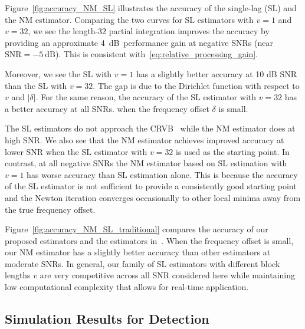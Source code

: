 Figure~\ref{fig:accuracy_NM_SL} illustrates the accuracy of the single-lag (SL) and the NM estimator.
Comparing the two curves for SL estimators with $v{=}1$ and $v=32$, 
we see the length-$32$ partial integration
improves the accuracy by providing an approximate
\SI{4}{\dB}~performance gain at negative SNRs
(near $\text{SNR}=\SI{-5}{\dB}$). This is consistent
with~\eqref{eq:relative_processing_gain}.

Moreover, we see the SL with $v=1$ has a slightly better accuracy 
at 10 dB SNR than the SL with $v=32$. The gap is due to the Dirichlet function with
respect to $v$ and $|\delta|$.
For the same reason, the accuracy of the SL estimator with $v=32$ has a better accuracy at all SNRs.
when the frequency offset $\delta$ is small.

The SL estimators do not approach the CRVB~\cite{Gini_98} while the NM
estimator does at high SNR. 
We also see that the NM estimator achieves improved accuracy at lower SNR
when the SL estimator with $v=32$ is used as the starting point. 
In contrast, at all negative SNRs the NM estimator based on SL estimation with $v=1$ has
worse accuracy than SL estimation alone.
This is because the accuracy of the SL estimator is not sufficient to
provide a consistently good starting point and the Newton iteration converges occasionally to 
other local minima away from the true frequency offset.

Figure~\ref{fig:accuracy_NM_SL_traditional} compares the accuracy of our proposed estimators
and the estimators in~\cite{kay_89,Fitz_94,Luise_Reggiannini_95}.
When the 
frequency offset is small, our NM estimator has a slightly better accuracy than other estimators at moderate SNRs.
In general, our family of  SL estimators with different block lengths $v$
are very competitive across all SNR considered here while maintaining
low computational complexity that allows for real-time application.

\subsection{Simulation Results for Detection}


